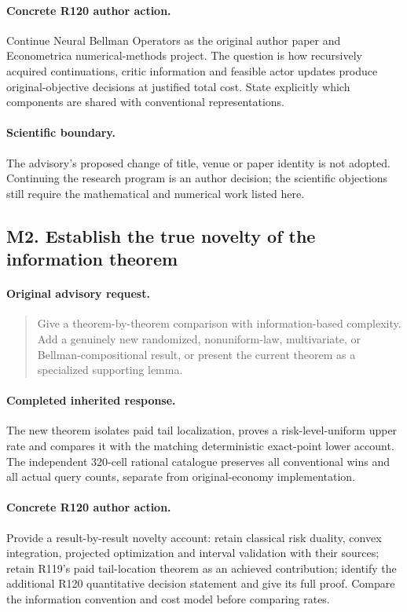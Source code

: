 \paragraph{Concrete R120 author action.}
Continue Neural Bellman Operators as the original author paper and Econometrica numerical-methods project. The question is how recursively acquired continuations, critic information and feasible actor updates produce original-objective decisions at justified total cost. State explicitly which components are shared with conventional representations.
\paragraph{Scientific boundary.}
The advisory's proposed change of title, venue or paper identity is not adopted. Continuing the research program is an author decision; the scientific objections still require the mathematical and numerical work listed here.

\subsection{M2. Establish the true novelty of the information theorem}
\label{response120:M2}
\paragraph{Original advisory request.}
\begin{quote}
Give a theorem-by-theorem comparison with information-based complexity. Add a genuinely new randomized, nonuniform-law, multivariate, or Bellman-compositional result, or present the current theorem as a specialized supporting lemma.
\end{quote}
\paragraph{Completed inherited response.}
The new theorem isolates paid tail localization, proves a risk-level-uniform upper rate and compares it with the matching deterministic exact-point lower account. The independent 320-cell rational catalogue preserves all conventional wins and all actual query counts, separate from original-economy implementation.
\paragraph{Concrete R120 author action.}
Provide a result-by-result novelty account: retain classical risk duality, convex integration, projected optimization and interval validation with their sources; retain R119's paid tail-location theorem as an achieved contribution; identify the additional R120 quantitative decision statement and give its full proof. Compare the information convention and cost model before comparing rates.
